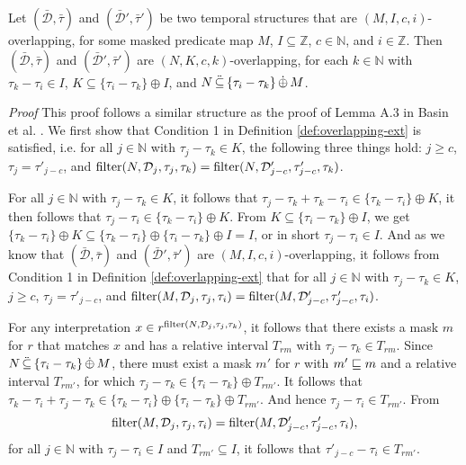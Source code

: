 \begin{lemma}
    \label{lem:eri-overlap-transitivity}
    Let $(\bar{\mathcal{D}}, \bar{\tau})$
        and
        $(\bar{\mathcal{D}}', \bar{\tau}')$ be two temporal structures that are $(M,I,c,i)$-overlapping,
            for some masked predicate map $M$,
            $I \subseteq \mathbb{Z}$,
            $c \in \mathbb{N}$,
            and $i \in \mathbb{Z}$.
    Then $(\bar{\mathcal{D}}, \bar{\tau})$ and $(\bar{\mathcal{D}}', \bar{\tau}')$
    are $(N, K, c, k)$-overlapping,
        for each $k \in \mathbb{N}$
        with $\tau_k - \tau_i \in I$, $K \subseteq \{ \tau_i - \tau_k \} \oplus I$,
        and $N \,\ddot{\subseteq}\, \{ \tau_i - \tau_k \} \,\dot{\oplus}\, M$.
\end{lemma}
\textit{Proof} 
This proof follows a similar structure as the proof of Lemma A.3 in Basin et al. \cite{Basin2016}.
We first show that Condition 1 in Definition \ref{def:overlapping-ext} is satisfied, i.e.
for all $j \in \mathbb{N}$ with $\tau_j - \tau_k \in K$,
the following three things hold:
$j \geq c$,
$\tau_j = \tau'_{j-c}$,
and
$ \operatorname{filter}(N, \mathcal{D}_j, \tau_j, \tau_k) = \operatorname{filter}(N, \mathcal{D}'_{j-c}, \tau'_{j-c}, \tau_k)$.

For all $j \in \mathbb{N}$ with $\tau_j - \tau_k \in K$,
    it follows that $\tau_j - \tau_k + \tau_k - \tau_i \in \{\tau_k - \tau_i \} \oplus K$,
    it then follows that $\tau_j - \tau_i \in \{\tau_k - \tau_i\} \oplus K$. 
From $K \subseteq \{ \tau_i - \tau_k \} \oplus I$,
    we get $\{\tau_k - \tau_i\} \oplus K \subseteq \{\tau_k - \tau_i \} \oplus \{\tau_i - \tau_k \} \oplus I = I$,
    or in short $\tau_j - \tau_i \in I$.
And as we know that $(\bar{\mathcal{D}}, \bar{\tau})$
    and $(\bar{\mathcal{D}}', \bar{\tau}')$ are $(M,I,c,i)$-overlapping,
    it follows from Condition 1 in Definition \ref{def:overlapping-ext} that
    for all $j \in \mathbb{N}$ with $\tau_j - \tau_k \in K$,
    $j \geq c$, $\tau_j = \tau'_{j-c}$,
    and $\operatorname{filter}(M, \mathcal{D}_j, \tau_j, \tau_i) = \operatorname{filter}(M, \mathcal{D}'_{j-c}, \tau'_{j-c}, \tau_i)$.

For any interpretation $x \in r^{\operatorname{filter}(N, \mathcal{D}_j, \tau_j, \tau_k)}$, it follows that there exists a mask $m$ for $r$ that matches $x$ and has a relative interval $T_{rm}$ with $\tau_j - \tau_k \in T_{rm}$.
Since $N \,\ddot{\subseteq}\, \{ \tau_i - \tau_k \} \,\dot{\oplus}\, M$, there must exist a mask $m'$ for $r$ with $m' \sqsubseteq m$ and a relative interval $T_{rm'}$, for which $\tau_j - \tau_k \in \{ \tau_i - \tau_k \} \oplus T_{rm'}$.
It follows that $\tau_k - \tau_i + \tau_j - \tau_k \in \{ \tau_k - \tau_i\} \oplus \{ \tau_i - \tau_k\} \oplus T_{rm'}$.
And hence $\tau_j - \tau_i \in T_{rm'}$.
From
\begin{equation*}
    \operatorname{filter}(M, \mathcal{D}_j, \tau_j, \tau_i)
    = \operatorname{filter}(M, \mathcal{D}'_{j-c}, \tau'_{j-c}, \tau_i),
\end{equation*}
for all $j \in \mathbb{N}$ with $\tau_j - \tau_i \in I$ and $T_{rm'} \subseteq I$, it follows that 
$\tau'_{j-c} - \tau_i \in T_{rm'}$.

